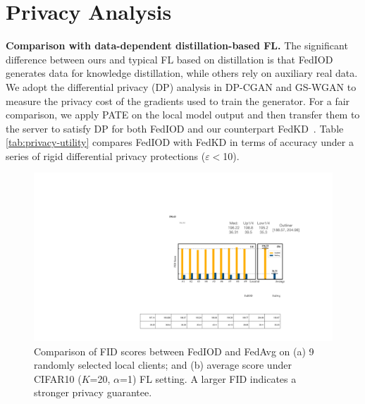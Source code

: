 \documentclass[letterpaper]{article} %
\begin{document}
\section{Privacy Analysis}
\textbf{Comparison with data-dependent distillation-based FL.}
The significant difference between ours and typical FL based on distillation is that FedIOD generates data for knowledge distillation, while others rely on auxiliary real data. We adopt the differential privacy (DP) analysis in DP-CGAN \cite{torkzadehmahani2019dp} and GS-WGAN \cite{chen2020gs} to measure the privacy cost of the gradients used to train the generator. For a fair comparison, we apply PATE \cite{papernot2018scalable} on the local model output and then transfer them to the server to satisfy DP for both FedIOD and our counterpart FedKD~\cite{gong2022preserving}. Table \ref{tab:privacy-utility} compares FedIOD with FedKD in terms of accuracy under a series of rigid differential privacy protections ($\varepsilon <$10). 



\begin{figure}[h]
\centering
\includegraphics[width=0.95\linewidth]{fig/fig6.pdf}
\caption{ Comparison of FID scores between FedIOD and FedAvg on (a) 9 randomly selected local clients; and (b) average score under CIFAR10 ($K$=20, $\alpha$=1) FL setting. A larger FID indicates a stronger privacy guarantee.  
} 
\label{fig:fid}
\end{figure}

\end{document}
